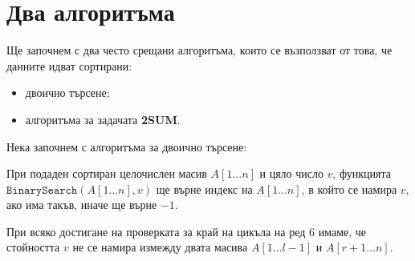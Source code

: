 \section{Два алгоритъма}

Ще започнем с два често срещани алгоритъма, които се възползват от това, че данните идват сортирани:
\begin{itemize}
    \item двоично търсене;
    \item алгоритъма за задачата \textbf{2SUM}.
\end{itemize}

Нека започнем с алгоритъма за двоично търсене:


При подаден сортиран целочислен масив $A[1 \dots n]$ и цяло число $v$, функцията $\mathtt{BinarySearch}(A[1 \dots n], v)$ ще върне индекс на $A[1 \dots n]$, в който се намира $v$, ако има такъв, иначе ще върне $-1$.

\newpage

\begin{invariant}
    При всяко достигане на проверката за край на цикъла на ред $6$ имаме, че стойността $v$ не се намира измежду двата масива $A[1 \dots l - 1]$ и $A[r + 1 \dots n]$.
\end{invariant}

